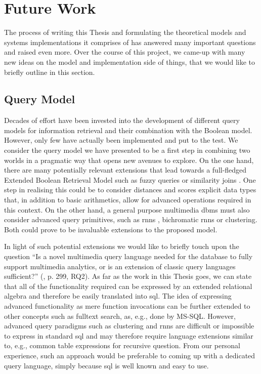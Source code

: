 \section{Future Work}

The process of writing this Thesis and formulating the theoretical models and systems implementations it comprises of has answered many important questions and raised even more. Over the course of this project, we came-up with many new ideas on the model and implementation side of things, that we would like to briefly outline in this section.

\subsection{Query Model}

Decades of effort have been invested into the development of different query models for information retrieval and their combination with the Boolean model. However, only few have actually been implemented and put to the test. We consider the query model we have presented to be a first step in combining two worlds in a pragmatic way that opens new avenues to explore. On the one hand, there are many potentially relevant extensions that lead towards a full-fledged Extended Boolean Retrieval Model \cite{Salton:1983Extended} such as fuzzy queries \cite{Umano:1983Retrieval,Bohm:2001Fast} or similarity joins \cite{Yao:2010K}. One step in realising this could be to consider distances and scores explicit data types that, in addition to basic arithmetics, allow for advanced operations required in this context. On the other hand, a general purpose multimedia \acrshort{dbms} must also consider advanced query primitives, such as \acrshort{rnns} \cite{Korn:2000Influence}, bichromatic \acrshort{rnns} \cite{Stanoi:2001Discovery} or clustering. Both could prove to be invaluable extensions to the proposed model.

In light of such potential extensions we would like to briefly touch upon the question ``Is a novel multimedia query language needed for the database to fully support multimedia analytics, or is an extension of classic query languages sufficient?'' (\cite{Jonson:2016Ten}, p. 299, RQ2). As far as the work in this Thesis goes, we can state that all of the functionality required can be expressed by an extended relational algebra and therefore be easily translated into \acrshort{sql}. The idea of expressing advanced functionality as mere function invocations can be further extended to other concepts such as fulltext search, as, e.g., done by MS-SQL. However, advanced query paradigms such as clustering and \acrshort{rnns} are difficult or impossible to express in standard \acrshort{sql} and may therefore require language extensions similar to, e.g., common table expressions for recursive question. From our personal experience, such an approach would be preferable to coming up with a dedicated query language, simply because \acrshort{sql} is well known and easy to use.

